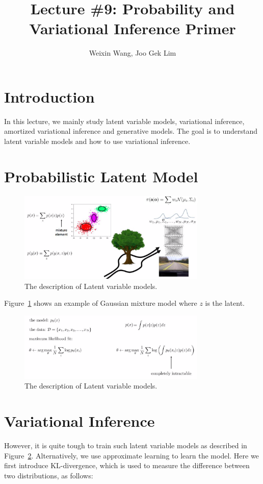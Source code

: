 \documentclass{article}
\title{Lecture \#9: Probability and Variational Inference Primer}
\author{
  Weixin Wang, Joo Gek Lim \\
}
\begin{document}
\maketitle

\section{Introduction}
In this lecture, we mainly study latent variable models, variational inference, amortized variational inference and generative models. The goal is to understand latent variable models and how to use variational inference.


\section{Probabilistic Latent Model}
\begin{figure}[h]
    \centering
	\includegraphics[width=0.8\textwidth]{fig/latent_model.png}
	\caption{The description of Latent variable models.}
	\label{fig:latent}
\end{figure}

Figure~\ref{fig:latent} shows an example of Gaussian mixture model where $z$ is the latent. 

\begin{figure}[h]
    \centering
	\includegraphics[width=0.8\textwidth]{fig/train_model.png}
	\caption{The description of Latent variable models.}
	\label{fig:train}
\end{figure}

\section{Variational Inference}
However, it is quite tough to train such latent variable models as described in Figure~\ref{fig:train}. Alternatively, we use approximate learning to learn the model. Here we first introduce KL-divergence, which is used to measure the difference between two distributions, as follows:
\end{document}
